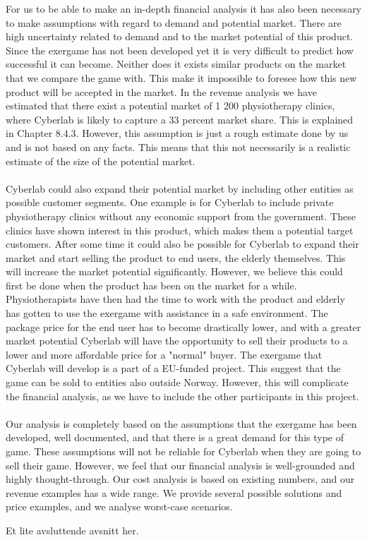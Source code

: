 For us to be able to make an in-depth financial analysis it has also been necessary to make assumptions with regard to demand and potential market.
There are high uncertainty related to demand and to the market potential of this product. Since the exergame has not been developed yet it is very difficult to predict how successful it can become. Neither does it exists similar products on the market that we compare the game with. This make it impossible to foresee how this new product will be accepted in the market. In the revenue analysis we have estimated that there exist a potential market of 1 200 physiotherapy clinics, where Cyberlab is likely to capture a 33 percent market share. This is explained in Chapter 8.4.3. However, this assumption is just a rough estimate done by us and is not based on any facts. This means that this not necessarily is a realistic estimate of the size of the potential market. \\ \\
Cyberlab could also expand their potential market by including other entities as possible customer segments. One example is for Cyberlab to include private physiotherapy clinics without any economic support from the government. These clinics have shown interest in this product, which makes them a potential target customers.  After some time it could also be possible for Cyberlab to expand their market and start selling the product to end users, the elderly themselves. This will increase the market potential significantly. However, we believe this could first be done when the product has been on the market for a while. Physiotherapists have then had the time to work with the product and elderly has gotten to use the exergame with assistance in a safe environment. The package price for the end user has to become drastically lower, and with a greater market potential Cyberlab will have the opportunity to sell their products to a lower and more affordable price for a "normal" buyer. The exergame that Cyberlab will develop is a part of a EU-funded project. This suggest that the game can be sold to entities also outside Norway. However, this will complicate the financial analysis, as we have to include the other participants in this project. \\ \\
Our analysis is completely based on the assumptions that the exergame has been developed, well documented, and that there is a great demand for this type of game. These assumptions will not be reliable for Cyberlab when they are going to sell their game. However, we feel that our financial analysis is well-grounded and highly thought-through. Our cost analysis is based on existing numbers, and our revenue examples has a wide range. We provide several possible solutions and price examples, and we analyse worst-case scenarios.  

Et lite avsluttende avsnitt her.


